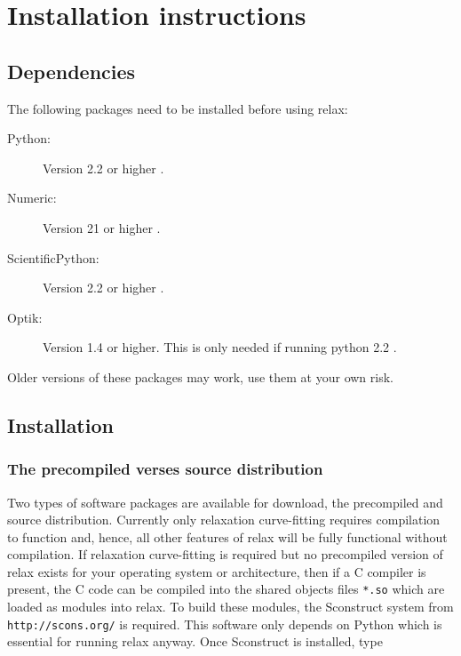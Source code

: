 
\chapter{Installation instructions}



\section{Dependencies}

The following packages need to be installed before using relax:

\begin{description}
\item[Python:]  Version 2.2 or higher .
\item[Numeric:]  Version 21 or higher .
\item[ScientificPython:]  Version 2.2 or higher .
\item[Optik:]  Version 1.4 or higher.  This is only needed if running python 2.2 .
\end{description}

Older versions of these packages may work, use them at your own risk.




\section{Installation}


\subsection{The precompiled verses source distribution}

Two types of software packages are available for download, the precompiled and source distribution.  Currently only relaxation curve-fitting requires compilation to function and, hence, all other features of relax will be fully functional without compilation.  If relaxation curve-fitting is required but no precompiled version of relax exists for your operating system or architecture, then if a C compiler is present, the C code can be compiled into the shared objects files \texttt{*.so} which are loaded as modules into relax.  To build these modules, the Sconstruct system from \texttt{http://scons.org/} is required.  This software only depends on Python which is essential for running relax anyway.  Once Sconstruct is installed, type


